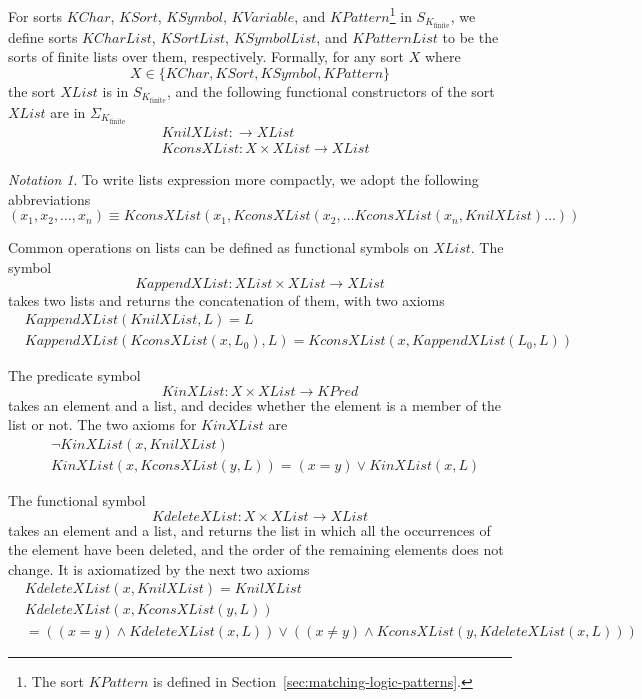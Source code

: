 \documentclass[UTF8,11pt]{article}
\newcounter{thmcounter}
\theoremstyle{plain}
\theoremstyle{definition}
\theoremstyle{remark}
\newtheorem{notation}   [thmcounter]{Notation}
\newcommand{\Kfinite}{{K_\text{finite}}}
\newcommand{\KPred}{\mathit{KPred}}
\newcommand{\KChar}{\mathit{KChar}}
\newcommand{\KCharList}{\mathit{KCharList}}
\newcommand{\KSort}{\mathit{KSort}}
\newcommand{\KSymbol}{\mathit{KSymbol}}
\newcommand{\XList}{\mathit{XList}}
\newcommand{\KnilXList}{\mathit{KnilXList}}
\newcommand{\KconsXList}{\mathit{KconsXList}}
\newcommand{\KappendXList}{\mathit{KappendXList}}
\newcommand{\KinXList}{\mathit{KinXList}}
\newcommand{\KdeleteXList}{\mathit{KdeleteXList}}
\newcommand{\KPatternList}{\mathit{KPatternList}}
\newcommand{\KSortList}{\mathit{KSortList}}
\newcommand{\KSymbolList}{\mathit{KSymbolList}}
\newcommand{\KVariable}{\mathit{KVariable}}
\newcommand{\KPattern}{\mathit{KPattern}}
\begin{document}
For sorts $\KChar$, $\KSort$, $\KSymbol$, $\KVariable$, and 
$\KPattern$\footnote{The sort $\KPattern$ is defined in 
Section~\cref{sec:matching-logic-patterns}.}
in $S_\Kfinite$,
we define sorts $\KCharList$, $\KSortList$, $\KSymbolList$, and $\KPatternList$ to be the sorts of finite lists over them, respectively.
Formally, for any sort $X$ where
$$
X \in \{\KChar, \KSort, \KSymbol, \KPattern\}
$$
the sort $\XList$ is in $S_\Kfinite$, and the following functional constructors of the sort $\XList$ are in $\Sigma_\Kfinite$
\begin{align*}
  & \KnilXList \colon \to \XList
  \\
  & \KconsXList \colon \mathit{X} \times \XList \to \XList
\end{align*}

\begin{notation}
\label{notation:lists}
	To write lists expression more compactly, we adopt the following abbreviations
	\begin{equation*}
	  (x_1, x_2, \dots, x_n) \equiv \KconsXList(x_1, \KconsXList(x_2, \dots\KconsXList(x_n, \KnilXList)\dots))
	\end{equation*}
\end{notation}

Common operations on lists can be defined as functional symbols on $\XList$.
The symbol $$\KappendXList \colon \XList \times \XList \to \XList$$ 
takes two lists and returns the concatenation of them, with two axioms
\begin{align*}
  & \KappendXList(\KnilXList, L) = L
  \\
  & \KappendXList(\KconsXList(x, L_0), L) = \KconsXList(x, \KappendXList(L_0, L))
\end{align*}

The predicate symbol $$\KinXList \colon \mathit{X} \times \XList \to \KPred$$
takes an element and a list, and decides whether the element is a member of the 
list or not. The two axioms for $\KinXList$ are
\begin{align*}
  & \neg \KinXList(x, \KnilXList)
  \\
  & \KinXList(x, \KconsXList(y, L)) = (x = y) \vee \KinXList(x, L)
\end{align*}

The functional symbol $$\KdeleteXList \colon \mathit{X} \times \XList \to \XList$$
takes an element and a list, and returns the list in which all the occurrences
of the element have been deleted, and the order of the remaining elements does not
change.
It is axiomatized by the next two axioms
\begin{align*}
  & \KdeleteXList(x, \KnilXList) = \KnilXList
  \\
  & \KdeleteXList(x, \KconsXList(y, L))
  \\
  & = ((x = y) \wedge \KdeleteXList(x, L)) \vee ((x \neq y) \wedge \KconsXList(y, \KdeleteXList(x, L)))
\end{align*}
\end{document}
